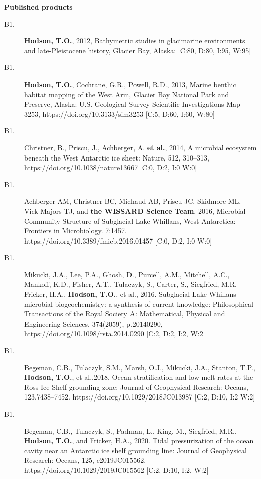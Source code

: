 \documentclass[12pt]{article}
\makeatletter
\def\namedlabel#1#2{\begingroup
	\def\@currentlabel{#2}%
	\label{#1}\endgroup
}
\makeatother
\begin{document}
\vspace{10pt}
\raggedright \textbf{Published products} \\
\vspace{10pt}

\begin{description}
	\item[B1.\namedlabel{thesis}{B1}]
    \textbf{Hodson, T.O.},
    2012, Bathymetric studies in glacimarine environments and late-Pleistocene history, Glacier Bay, Alaska:
    [C:80, D:80, I:95, W:95]

	\item[B1.\namedlabel{westarm}{B1}]
    \textbf{Hodson, T.O.}, Cochrane, G.R., Powell, R.D.,
    2013, Marine benthic habitat mapping of the West Arm, Glacier Bay National Park and Preserve, Alaska:
    U.S. Geological Survey Scientific Investigations Map 3253,
    https://doi.org/10.3133/sim3253
    [C:5, D:60, I:60, W:80]

	\item[B1.\namedlabel{wissard2}{B1}] 
    Christner, B., Priscu, J., Achberger, A. \textbf{et al.}, 
    2014, A microbial ecosystem beneath the West Antarctic ice sheet: Nature, 512, 310–313, https://doi.org/10.1038/nature13667
    [C:0, D:2, I:0 W:0]

	\item[B1.\namedlabel{wissard3}{B1}] 
    Achberger AM, Christner BC, Michaud AB, Priscu JC, Skidmore ML, Vick-Majors TJ, and \textbf{the WISSARD Science Team},
    2016, Microbial Community Structure of Subglacial Lake Whillans, West Antarctica: Frontiers in Microbiology. 7:1457.
    https://doi.org/10.3389/fmicb.2016.01457
    [C:0, D:2, I:0 W:0]

	\item[B1.\namedlabel{wissard3}{B1}] 
    Mikucki, J.A., Lee, P.A., Ghosh, D., Purcell, A.M., Mitchell, A.C., Mankoff, K.D., Fisher, A.T., Tulaczyk, S., Carter, S., Siegfried, M.R. Fricker, H.A., \textbf{Hodson, T.O.}, et al.,
    2016. Subglacial Lake Whillans microbial biogeochemistry: a synthesis of current knowledge:
    Philosophical Transactions of the Royal Society A: Mathematical, Physical and Engineering Sciences,
    374(2059), p.20140290,
    https://doi.org/10.1098/rsta.2014.0290
    [C:2, D:2, I:2, W:2]
    
	\item[B1.\namedlabel{wissardX}{B1}]
    Begeman, C.B., Tulaczyk, S.M., Marsh, O.J., Mikucki, J.A., Stanton, T.P., \textbf{Hodson, T.O.}, et al.,2018,
    Ocean stratification and low melt rates at the Ross Ice Shelf grounding zone:
    Journal of Geophysical Research: Oceans, 123,7438–7452. https://doi.org/10.1029/2018JC013987 
    [C:2, D:10, I:2 W:2]
    

	\item[B1.\namedlabel{wissardX}{B1}] 
    Begeman, C.B., Tulaczyk, S., Padman, L., King, M., Siegfried, M.R., \textbf{Hodson, T.O.}, and Fricker, H.A.,
    2020. Tidal pressurization of the ocean cavity near an Antarctic ice shelf grounding line:
    Journal of Geophysical Research: Oceans, 125, e2019JC015562. 
    https://doi.org/10.1029/2019JC015562
    [C:2, D:10, I:2, W:2]
\end{description}
\end{document}
